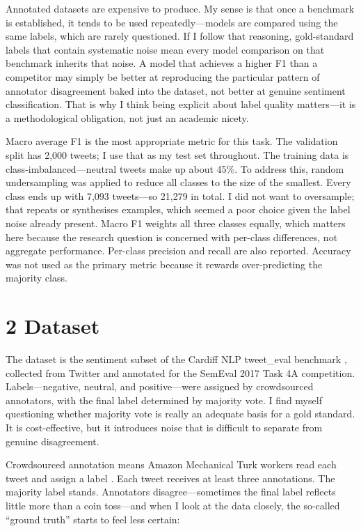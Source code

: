 \documentclass[12pt]{article}
\begin{document}
Annotated datasets are expensive to produce. My sense is that once a benchmark is established, it tends to be used repeatedly---models are compared using the same labels, which are rarely questioned. If I follow that reasoning, gold-standard labels that contain systematic noise mean every model comparison on that benchmark inherits that noise. A model that achieves a higher F1 than a competitor may simply be better at reproducing the particular pattern of annotator disagreement baked into the dataset, not better at genuine sentiment classification. That is why I think being explicit about label quality matters---it is a methodological obligation, not just an academic nicety.

Macro average F1 is the most appropriate metric for this task. The validation split has 2,000 tweets; I use that as my test set throughout. The training data is class-imbalanced---neutral tweets make up about 45\%. To address this, random undersampling was applied to reduce all classes to the size of the smallest. Every class ends up with 7,093 tweets---so 21,279 in total. I did not want to oversample; that repeats or synthesises examples, which seemed a poor choice given the label noise already present. Macro F1 weights all three classes equally, which matters here because the research question is concerned with per-class differences, not aggregate performance. Per-class precision and recall are also reported. Accuracy was not used as the primary metric because it rewards over-predicting the majority class.



\section*{2 Dataset}



The dataset is the sentiment subset of the Cardiff NLP tweet\_eval benchmark \citep{barbieri2020tweeteval}, collected from Twitter and annotated for the SemEval 2017 Task 4A competition. Labels---negative, neutral, and positive---were assigned by crowdsourced annotators, with the final label determined by majority vote. I find myself questioning whether majority vote is really an adequate basis for a gold standard. It is cost-effective, but it introduces noise that is difficult to separate from genuine disagreement.

Crowdsourced annotation means Amazon Mechanical Turk workers read each tweet and assign a label \citep{rosenthal2017semeval}. Each tweet receives at least three annotations. The majority label stands. Annotators disagree---sometimes the final label reflects little more than a coin toss---and when I look at the data closely, the so-called ``ground truth'' starts to feel less certain:
\end{document}
